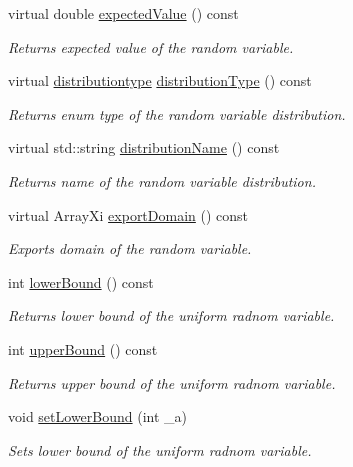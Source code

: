 \begin{DoxyCompactItemize}
virtual double \hyperlink{class_c_uniform_d_r_v_a25a9923ef347bcf7b00ceb9022ddeade}{expected\-Value} () const 
\begin{DoxyCompactList}\small\item\em Returns expected value of the random variable. \end{DoxyCompactList}\item 
virtual \hyperlink{class_c_random_variable_a80d2a87c43847274138b51f7d713d7f1}{distributiontype} \hyperlink{class_c_uniform_d_r_v_afeb83cfc2424f7687fbb09e67d18dc3e}{distribution\-Type} () const 
\begin{DoxyCompactList}\small\item\em Returns enum type of the random variable distribution. \end{DoxyCompactList}\item 
virtual std\-::string \hyperlink{class_c_uniform_d_r_v_a6d0c29215bd5ed56db2ff2e5a29c402e}{distribution\-Name} () const 
\begin{DoxyCompactList}\small\item\em Returns name of the random variable distribution. \end{DoxyCompactList}\item 
virtual Array\-Xi \hyperlink{class_c_uniform_d_r_v_ac8e01c8b8e6f9403855259da5511fa89}{export\-Domain} () const 
\begin{DoxyCompactList}\small\item\em Exports domain of the random variable. \end{DoxyCompactList}\item 
int \hyperlink{class_c_uniform_d_r_v_a813fa4aa08b957def7d63c6710fc885b}{lower\-Bound} () const 
\begin{DoxyCompactList}\small\item\em Returns lower bound of the uniform radnom variable. \end{DoxyCompactList}\item 
int \hyperlink{class_c_uniform_d_r_v_a3bb09d320f39b56effd7984fd784c551}{upper\-Bound} () const 
\begin{DoxyCompactList}\small\item\em Returns upper bound of the uniform radnom variable. \end{DoxyCompactList}\item 
void \hyperlink{class_c_uniform_d_r_v_a9ea70c6f5d00e516ebb70c836aaac18f}{set\-Lower\-Bound} (int \-\_\-a)
\begin{DoxyCompactList}\small\item\em Sets lower bound of the uniform radnom variable. \end{DoxyCompactList}\item 

\end{DoxyCompactItemize}
